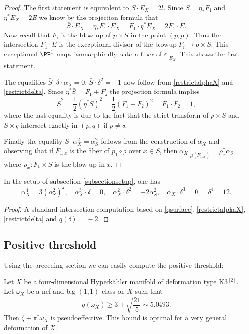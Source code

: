 \begin{proof}
The first statement is equivalent to $\bar S \cdot E_X = 2l$.
Since $\bar S = \eta_* F_1$ and $\eta^* E_X = 2 E$ we know by the projection formula that
\[
\bar S \cdot E_X = \eta_* F_1 \cdot E_X = F_1 \cdot \eta^* E_X = 2 F_1 \cdot E.
\]
Now recall that $F_i$ is the blow-up of $p \times S$ in the point $(p,p)$. Thus the intersection $F_1 \cdot E$ is the
exceptional divisor of the blowup $F_i \to p \times S$. This exceptional $\PP^1$
maps isomorphically onto a fiber of $\varepsilon|_{E_X}$. This shows the first statement.

The equalities $\bar S \cdot \delta \cdot \alpha_X = 0, \ \bar S \cdot \delta^2=-1$ now follow from
\eqref{restrictalphaX} and \eqref{restrictdelta}.
Since $\eta^* \bar S = F_1 + F_2$ the projection formula implies
\[
\bar S^2 = \frac{1}{2} (\eta^* \bar S)^2 = \frac{1}{2} (F_1 + F_2)^2 = F_1 \cdot F_2 = 1,
\]
where the last equality is due to the fact that the strict transform of $p \times S$ and $S \times q$ intersect exactly
in $(p,q)$ if $p \neq q$.

Finally the equality $\bar S \cdot \alpha_X^2=\alpha_S^2$ follows from the construction of $\alpha_X$ \cite[\S 6, Prop.\,6]{Bea83} and observing that if $F_{1,x}$ is the fiber of $p_1 \circ \rho$ over $x \in S$, then
$\alpha_X|_{\mu(F_{1,x})} = \rho_x^* \alpha_S$ where $\rho_x: F_1 \times S$ is the blow-up in $x$.
\end{proof}

\begin{lemma} \label{intersectionsX}
In the setup of subsection \ref{subsectionsetup}, one has
\[
\alpha_X^4 = 3 (\alpha_S^2)^2,
\quad
\alpha_X^3 \cdot \delta = 0,
\quad
\alpha_X^2 \cdot \delta^2 = - 2 \alpha_S^2,
\quad
\alpha_X \cdot \delta^3 = 0,
\quad
\delta^4 = 12.
\]
\end{lemma}

\begin{proof}
A standard intersection computation based on \eqref{qsurface}, \eqref{restrictalphaX},
\eqref{restrictdelta} and \hbox{$q(\delta)\!=\!-2$}.
\end{proof}

\subsection{Positive threshold}

Using the preceding section we can easily compute the positive threshold:

\begin{corollary}\label{corollaryK3square}
Let $X$ be a four-dimensional Hyperkähler manifold of deformation type K3$^{[2]}$.
Let $\omega_X$ be a nef and big $(1,1)$-class on $X$ such that
\[
q(\omega_X)\geq 3+\sqrt{\frac{21}{5}}\sim 5.0493.
\]
Then $\zeta+\pi^*\omega_X$ is pseudoeffective.
This bound is optimal for a very general deformation of $X$.
\end{corollary}

